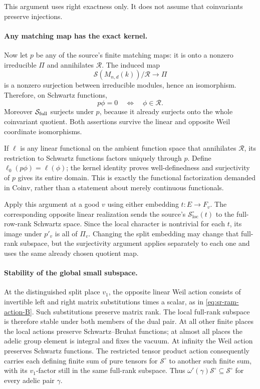 This argument uses right exactness only.  It does not
assume that coinvariants preserve injections.

\paragraph{Any matching map has the exact kernel.}
Now let \(p\) be any of the source's finite matching maps:
it is onto a nonzero irreducible \(\Pi\) and annihilates
\(\mathcal R\).
The induced map
\[
       \mathcal S(M_{n,d}(k))/\mathcal R\longrightarrow\Pi
\]
is a nonzero surjection between irreducible modules, hence
an isomorphism.  Therefore, on Schwartz functions,
\[
                       p\phi=0\quad\Longleftrightarrow\quad
                                      \phi\in\mathcal R.
\]
Moreover \(\mathcal S_{\rm full}\) surjects under \(p\),
because it already surjects onto the whole coinvariant
quotient.  Both assertions survive the linear and opposite
Weil coordinate isomorphisms.

If \(\ell\) is any linear functional on the ambient
function space that annihilates \(\mathcal R\), its
restriction to Schwartz functions factors uniquely through
\(p\).  Define \(\ell_0(p\phi)=\ell(\phi)\); the kernel
identity proves well-definedness and surjectivity of \(p\)
gives its entire domain.  This is exactly the functional
factorization demanded in \(\mathrm{Coinv}\), rather than
a statement about merely continuous functionals.

Apply this argument at a good \(v\) using either embedding
\(t:E\to F_v\).  The corresponding opposite linear
realization sends the source's
\(\mathcal S^\circ_{\mathrm{loc}}(t)\) to the full-row-rank
Schwartz space.  Since the local character is nontrivial
for each \(t\), its image under \(p'_v\) is all of \(\Pi_v\).
Changing the split embedding may change that full-rank
subspace, but the surjectivity argument applies separately
to each one and uses the same already chosen quotient map.

\paragraph{Stability of the global small subspace.}
At the distinguished split place \(v_1\), the opposite linear
Weil action consists of invertible left and right matrix
substitutions times a scalar, as in
\eqref{eq:sr-ram-action-B}.  Such substitutions preserve
matrix rank.  The local full-rank subspace is therefore
stable under both members of the dual pair.
At all other finite places the local actions preserve
Schwartz--Bruhat functions; at almost all places the
adelic group element is integral and fixes the vacuum.
At infinity the Weil action preserves Schwartz functions.
The restricted tensor product action consequently carries
each defining finite sum of pure tensors for
\(\mathcal S^\circ\) to another such finite sum, with its
\(v_1\)-factor still in the same full-rank subspace.
Thus \(\omega'(\gamma)\mathcal S^\circ
\subseteq\mathcal S^\circ\) for every adelic pair \(\gamma\).

